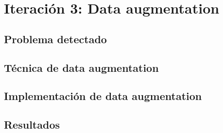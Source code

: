 \chapter{Iteración 3: Data augmentation}\label{data_augmentation}

\section{Problema detectado}\label{sec:data_augmentation_problem}

\section{Técnica de data augmentation}\label{sec:data_augmentation_change}

\section{Implementación de data augmentation}\label{sec:data_augmentation_change}

\section{Resultados}\label{sec:data_augmentation_resultados}
